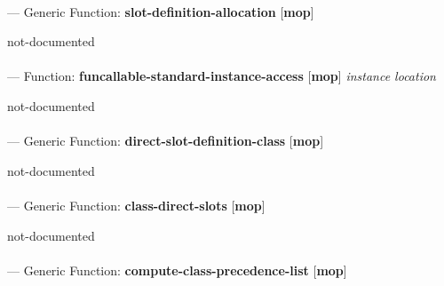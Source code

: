 \paragraph{}
\label{MOP:SLOT-DEFINITION-ALLOCATION}
--- Generic Function: \textbf{slot-definition-allocation} [\textbf{mop}] \textit{}

\begin{adjustwidth}{5em}{5em}
not-documented
\end{adjustwidth}

\paragraph{}
\label{MOP:FUNCALLABLE-STANDARD-INSTANCE-ACCESS}
--- Function: \textbf{funcallable-standard-instance-access} [\textbf{mop}] \textit{instance location}

\begin{adjustwidth}{5em}{5em}
not-documented
\end{adjustwidth}

\paragraph{}
\label{MOP:DIRECT-SLOT-DEFINITION-CLASS}
--- Generic Function: \textbf{direct-slot-definition-class} [\textbf{mop}] \textit{}

\begin{adjustwidth}{5em}{5em}
not-documented
\end{adjustwidth}

\paragraph{}
\label{MOP:CLASS-DIRECT-SLOTS}
--- Generic Function: \textbf{class-direct-slots} [\textbf{mop}] \textit{}

\begin{adjustwidth}{5em}{5em}
not-documented
\end{adjustwidth}

\paragraph{}
\label{MOP:COMPUTE-CLASS-PRECEDENCE-LIST}
--- Generic Function: \textbf{compute-class-precedence-list} [\textbf{mop}] \textit{}

